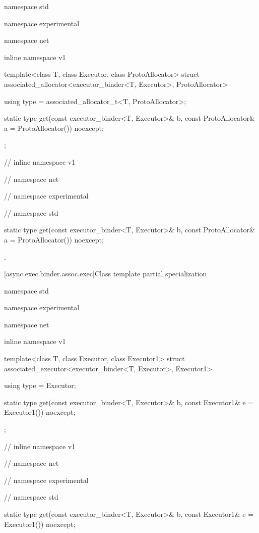 %
%
\begin{codeblock}
namespace std {
namespace experimental {
namespace net {
inline namespace v1 {

  template<class T, class Executor, class ProtoAllocator>
    struct associated_allocator<executor_binder<T, Executor>, ProtoAllocator>
  {
    using type = associated_allocator_t<T, ProtoAllocator>;

    static type get(const executor_binder<T, Executor>& b,
                    const ProtoAllocator& a = ProtoAllocator()) noexcept;
  };

} // inline namespace v1
} // namespace net
} // namespace experimental
} // namespace std
\end{codeblock}

\begin{itemdecl}
static type get(const executor_binder<T, Executor>& b,
                const ProtoAllocator& a = ProtoAllocator()) noexcept;
\end{itemdecl}

\begin{itemdescr}
\pnum
\returns {}.
\end{itemdescr}



[async.exec.binder.assoc.exec]{Class template partial specialization }

%
%
\begin{codeblock}
namespace std {
namespace experimental {
namespace net {
inline namespace v1 {

  template<class T, class Executor, class Executor1>
    struct associated_executor<executor_binder<T, Executor>, Executor1>
  {
    using type = Executor;

    static type get(const executor_binder<T, Executor>& b,
                    const Executor1& e = Executor1()) noexcept;
  };

} // inline namespace v1
} // namespace net
} // namespace experimental
} // namespace std
\end{codeblock}

\begin{itemdecl}
static type get(const executor_binder<T, Executor>& b,
                const Executor1& e = Executor1()) noexcept;
\end{itemdecl}

